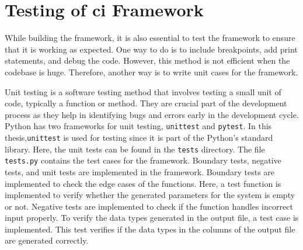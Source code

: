 \section{Testing of \acrshort{ci} Framework}
While building the framework, it is also essential to test the framework to ensure that it is working as expected. One way to do is to include breakpoints, add print 
statements, and debug the code. However, this method is not efficient when the codebase is huge. Therefore, another way is to write unit cases for the framework.

Unit testing is a software testing method that involves testing a small unit of code, typically a function or method. They are crucial part of the development 
process as they help in identifying bugs and errors early in the development cycle. Python has two frameworks for unit testing, \texttt{unittest} and 
\texttt{pytest}. In this thesis,\texttt{unittest} is used for testing since it is part of the Python's standard library. Here, the unit tests can be found 
in the \texttt{tests} directory. The file \texttt{tests.py} contains the test cases for the framework. %
Boundary tests, negative tests, and unit tests are implemented in the framework. Boundary tests are implemented to check the edge cases of the functions. Here, 
a test function is implemented to verify whether the generated parameters for the system is empty or not. Negative tests are implemented to check if the function 
handles incorrect input properly. To verify the data types generated in the output file, a test case is implemented. This test verifies if the data types in 
the columns of the output file are generated correctly. 

